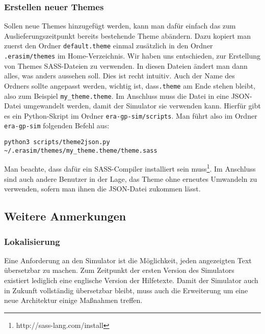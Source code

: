 \subsubsection{Erstellen neuer Themes}

Sollen neue Themes hinzugefügt werden, kann man dafür einfach das zum Auslieferungszeitpunkt
bereits bestehende Theme abändern. Dazu kopiert man zuerst den Ordner \texttt{default.theme}
einmal zusätzlich in den Ordner \texttt{.erasim/themes} im Home-Verzeichnis. Wir haben uns entschieden, zur Erstellung von Themes SASS-Dateien zu verwenden. In diesen Dateien ändert man dann
alles, was anders aussehen soll. Dies ist recht intuitiv. Auch der Name des Ordners sollte angepasst werden, wichtig ist, dass\texttt{.theme} am Ende stehen bleibt, also zum Beispiel \texttt{my\_theme.theme}. Im Anschluss muss die Datei in eine JSON-Datei umgewandelt werden, damit der Simulator sie verwenden kann. Hierfür gibt es ein Python-Skript im Ordner \texttt{era-gp-sim/scripts}.
Man führt also im Ordner \texttt{era-gp-sim} folgenden Befehl aus:
\begin{lstlisting}
python3 scripts/theme2json.py ~/.erasim/themes/my_theme.theme/theme.sass
\end{lstlisting}
Man beachte, dass dafür ein SASS-Compiler installiert sein muss\footnote{http://sass-lang.com/install}.
Im Anschluss sind auch andere Benutzer in der Lage, das Theme ohne erneutes Umwandeln zu verwenden, sofern man ihnen die JSON-Datei zukommen lässt.

 \subsection{Weitere Anmerkungen}

 \subsubsection{Lokalisierung}

 Eine Anforderung an den Simulator ist die Möglichkeit, jeden angezeigten Text
 übersetzbar zu machen. Zum Zeitpunkt der ersten Version des Simulators existiert
 lediglich eine englische Version der Hilfetexte. Damit der Simulator auch in
 Zukunft vollständig übersetzbar bleibt, muss auch die Erweiterung um eine neue
 Architektur einige Maßnahmen treffen.\\

